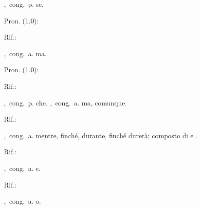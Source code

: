 ,\ cong.\ p.
se.
\begin{subvocedue}
\item[Pron. (1.0):] 
\item[Rif.:] 
\end{subvocedue}
,\ cong.\ a.
ma.
\begin{subvocedue}
\item[Pron. (1.0):] 
\item[Rif.:] 
\end{subvocedue}
,\ cong.\ p.
che.
,\ cong.\ a.
ma, comunque.
\begin{subvocedue}
\item[Rif.:] 
\end{subvocedue}
,\ cong.\ a.
mentre, finché, durante, finché durerà; composto di  e .
\begin{subvocedue}
\item[Rif.:] 
\end{subvocedue}
,\ cong.\ a.
e.
\begin{subvocedue}
\item[Rif.:] 
\end{subvocedue}
,\ cong.\ a.
o.
